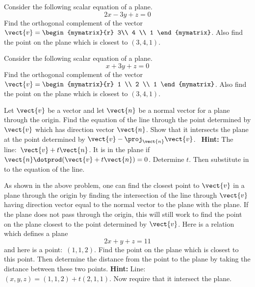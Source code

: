 
\begin{ex} Consider the following scalar equation of a plane.
\begin{equation*}
2x-3y+z=0
\end{equation*}
Find the orthogonal complement of the vector $\vect{v}=\begin{mymatrix}{r}
3\\
4 \\
1
\end{mymatrix}$.
Also find the point on the plane which is closest to $(3,4,1)$.
\end{ex}

\begin{ex} Consider the following scalar equation of a plane.
\begin{equation*}
x+3y+z=0
\end{equation*}
Find the orthogonal complement of the vector $\vect{v}=\begin{mymatrix}{r}
 1 \\
2 \\
1
\end{mymatrix}$.
Also find the point on the plane which is closest to $(3,4,1)$.
\end{ex}

\begin{ex} Let $\vect{v}$ be a vector and let $\vect{n}$ be a normal vector for a
plane through the origin. Find the equation of the line through the point
determined by $\vect{v}$ which has direction vector $\vect{n}$. Show that it
intersects the plane at the point determined by $\vect{v}-\proj_{\vect{n}
}\vect{v}$. \ \textbf{Hint: }The line:\ $\vect{v}+t\vect{n}$. It is in the
plane if $\vect{n}\dotprod (\vect{v}+t\vect{n}) =0$. Determine $t$.
Then substitute in to the equation of the line.
\end{ex}

\begin{ex} As shown in the above problem, one can find the closest point to $\vect{v}$ in a plane through the origin by finding the intersection of the line
through $\vect{v}$ having direction vector equal to the normal vector to the
plane with the plane. If the plane does not pass through the origin, this
will still work to find the point on the plane closest to the point
determined by $\vect{v}$. Here is a relation which defines a plane
\begin{equation*}
2x+y+z=11
\end{equation*}
and here is a point:\ $(1,1,2)$. Find the point on the plane
which is closest to this point. Then determine the distance from the point
to the plane by taking the distance between these two points. \textbf{Hint: }
Line: $(x,y,z) =(1,1,2) +t(2,1,1)$. Now
require that it intersect the plane. $\ $
\end{ex}


